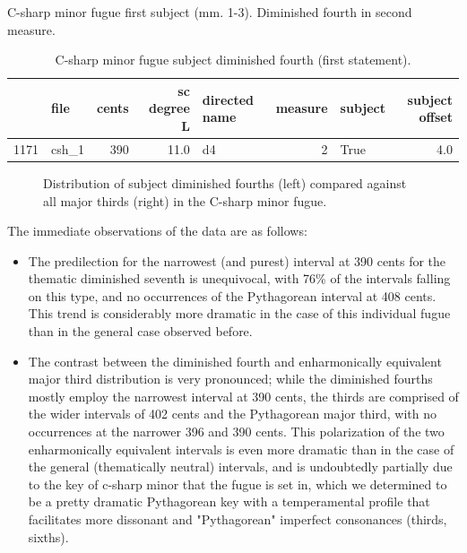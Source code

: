 \begin{Example}[H]
\vspace{1.5em}
    \centering
    \caption[Diminished fourth in c-sharp minor fugue first subject (mm. 1-3). ]{ C-sharp minor fugue first subject (mm. 1-3). Diminished fourth in second measure.}
\end{Example}    
\begin{singlespace}
\begin{table}[H]
\centering
\tiny
\begin{tabular}{|llrrlrlr|}
\hline
\textbf{{}} & \textbf{  file} & \textbf{ cents} & \textbf{ sc degree L} & \textbf{directed name} & \textbf{ measure} & \textbf{subject} & \textbf{ subject offset }\\
\hline
1171 &  csh\_1 &    390 &         11.0 &            d4 &        2 &    True &             4.0 \\
\hline
\end{tabular}
\caption{C-sharp minor fugue subject diminished fourth (first statement). }
\end{table}
\normalsize
\end{singlespace}



\begin{figure}[H]
\vspace{1.5em}
    \centering
    \caption[Distribution of subject diminished fourths compared against all major thirds in the C-sharp minor fugue. ]{Distribution of subject diminished fourths (left) compared against all major thirds (right) in the C-sharp minor fugue.}
\end{figure}    The immediate observations of the data are as follows:

\begin{itemize}
\tightlist
\item
  The predilection for the narrowest (and purest) interval at 390 cents
  for the thematic diminished seventh is unequivocal, with 76\% of the
  intervals falling on this type, and no occurrences of the Pythagorean
  interval at 408 cents. This trend is considerably more dramatic in the
  case of this individual fugue than in the general case observed
  before.
\item
  The contrast between the diminished fourth and enharmonically
  equivalent major third distribution is very pronounced; while the
  diminished fourths mostly employ the narrowest interval at 390 cents,
  the thirds are comprised of the wider intervals of 402 cents and the
  Pythagorean major third, with no occurrences at the narrower 396 and
  390 cents. This polarization of the two enharmonically equivalent
  intervals is even more dramatic than in the case of the general
  (thematically neutral) intervals, and is undoubtedly partially due to
  the key of c-sharp minor that the fugue is set in, which we determined
  to be a pretty dramatic Pythagorean key with a temperamental profile
  that facilitates more dissonant and "Pythagorean" imperfect
  consonances (thirds, sixths).
\end{itemize}

